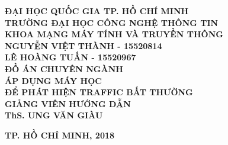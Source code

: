 \documentclass[main-report.tex]{subfiles}
\begin{document}
\begin{titlepage}
\thispagestyle{empty}
\thisfancypage{
\setlength{\fboxsep}{3pt}
\fbox}{} 
\begin{center}
{\bf\large ĐẠI HỌC QUỐC GIA TP. HỒ CHÍ MINH}\\
{\bf\subtitlesize TRƯỜNG ĐẠI HỌC CÔNG NGHỆ THÔNG TIN}\\
{\bf\subtitlesize KHOA MẠNG MÁY TÍNH VÀ TRUYỀN THÔNG}\\[4cm]

{\bf\large NGUYỄN VIỆT THÀNH - 15520814}\\
{\bf\large LÊ HOÀNG TUẤN - 15520967}\\[3.5cm]

{\bf\subtitlesize ĐỒ ÁN CHUYÊN NGÀNH}\\[0.5cm]
{\bf\LARGE ÁP DỤNG MÁY HỌC}\\
{\bf\LARGE ĐỂ PHÁT HIỆN TRAFFIC BẤT THƯỜNG}\\[5cm]

{\bf GIẢNG VIÊN HƯỚNG DẪN}\\
{\bf ThS. UNG VĂN GIÀU}
\end{center}

\vspace{4cm}
\begin{center}
{\bf TP. HỒ CHÍ MINH, 2018}
\end{center}
\end{titlepage}
\end{document}
